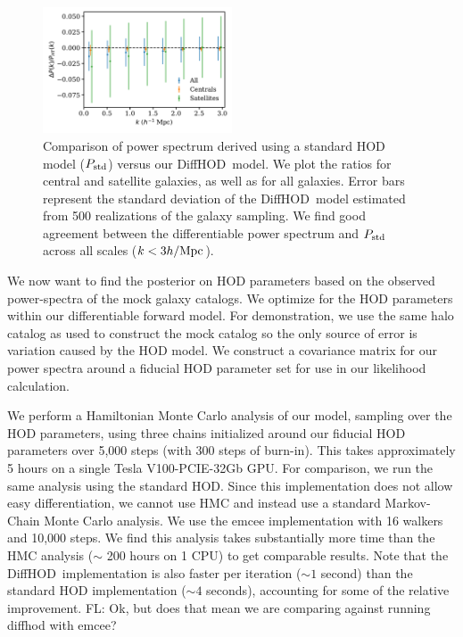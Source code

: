 \documentclass[a4paper,usenatbib]{mnras}
\newcommand{\FL}[1]{{\color{magenta}FL: #1}}
\newcommand{\dhod}{{\sc DiffHOD}}
\begin{document}
\begin{figure}
    \centering
    \includegraphics[width=0.50\textwidth]{paper/plots/ps_error.pdf}
    \caption{
    Comparison of power spectrum derived using a standard HOD model ($P_{\rm std}$)
    versus our \dhod~model. 
    We plot the ratios for central and satellite galaxies, as well as for all galaxies. 
    Error bars represent the standard deviation of the \dhod~model estimated from 
    500 realizations of the galaxy sampling.
    We find good agreement between the differentiable power spectrum and $P_{\rm std}$ 
    across all scales ($k < 3 h/{\rm Mpc}$).
    }
    \label{fig:ps}
\end{figure}

We now want to find the posterior on HOD parameters based on the observed power-spectra of the mock galaxy catalogs. We optimize for the HOD parameters within our differentiable forward model.
For demonstration, we use the same halo catalog as used to construct the mock catalog so the only source of error is variation caused by the HOD model. We construct a covariance matrix for our power spectra around a fiducial HOD parameter set for use in our likelihood calculation.

We perform a Hamiltonian Monte Carlo analysis of our model, sampling over the HOD parameters, using three chains initialized around our fiducial HOD parameters over 5,000 steps (with 300 steps of burn-in). This takes approximately 5 hours on a single Tesla V100-PCIE-32Gb GPU. For comparison, we run the same analysis using the standard HOD. 
Since this implementation does not allow easy differentiation, we cannot use HMC and instead use a standard Markov-Chain Monte Carlo analysis. We use the emcee \citep{2013PASP..125..306F} implementation with 16 walkers and 10,000 steps. We find this analysis takes substantially more time than the HMC analysis ($\sim$ 200 hours on 1 CPU) to get comparable results. 
Note that the \dhod~implementation 
is also faster per iteration (${\sim}1$ second) than the standard HOD implementation (${\sim}4$ seconds), accounting for some of the relative improvement.  \FL{Ok, but does that mean we are comparing against running diffhod with emcee?}
\end{document}
